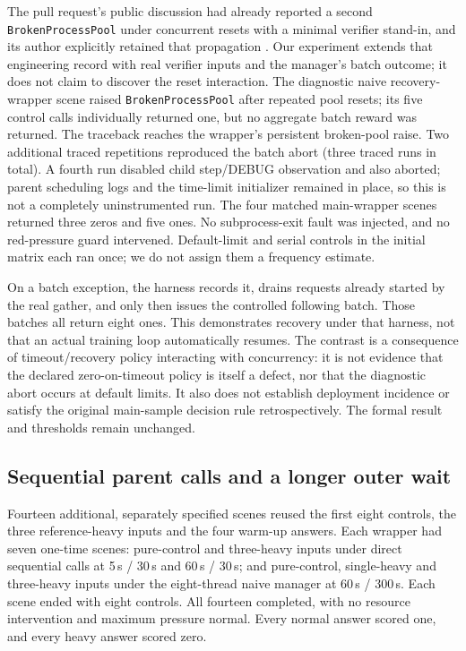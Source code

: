 \documentclass[10pt,a4paper]{article}
\let\cite\citep
\begin{document}
The pull request's public discussion had already reported a second
\texttt{BrokenProcessPool} under concurrent resets with a minimal verifier
stand-in, and its author explicitly retained that propagation
\cite{verl8015discussion}. Our experiment extends that engineering record
with real verifier inputs and the manager's batch outcome; it does not claim
to discover the reset interaction.
The diagnostic naive recovery-wrapper scene raised
\texttt{BrokenProcessPool} after repeated pool resets; its five control
calls individually returned one, but no aggregate batch reward was
returned. The traceback reaches the wrapper's persistent broken-pool
raise. Two additional traced repetitions reproduced the batch abort
(three traced runs in total). A fourth run disabled child step/DEBUG
observation and also aborted; parent scheduling logs and the time-limit
initializer remained in place, so this is not a completely uninstrumented
run. The four matched main-wrapper scenes returned three zeros and five
ones. No subprocess-exit fault was injected, and no red-pressure guard
intervened. Default-limit and serial controls in the initial matrix each
ran once; we do not assign them a frequency estimate.

On a batch exception, the harness records it, drains requests already
started by the real gather, and only then issues the controlled following
batch. Those batches all return eight ones. This demonstrates recovery
under that harness, not that an actual training loop automatically resumes.
The contrast is a consequence of timeout/recovery policy interacting with
concurrency: it is not evidence that the declared zero-on-timeout policy is
itself a defect, nor that the diagnostic abort occurs at default limits.
It also does not establish deployment incidence or satisfy the original
main-sample decision rule retrospectively. The formal result and thresholds
remain unchanged.

\subsection{Sequential parent calls and a longer outer wait}

Fourteen additional, separately specified scenes reused the first eight
controls, the three reference-heavy inputs and the four warm-up answers.
Each wrapper had seven one-time scenes: pure-control and three-heavy inputs
under direct sequential calls at 5\,s / 30\,s and 60\,s / 30\,s; and
pure-control, single-heavy and three-heavy inputs under the eight-thread
naive manager at 60\,s / 300\,s. Each scene ended with eight controls.
All fourteen completed, with no resource intervention and maximum pressure
normal. Every normal answer scored one, and every heavy answer scored zero.
\end{document}
